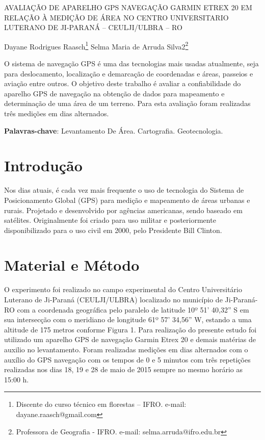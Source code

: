 \documentclass[article,12pt,onesidea,4paper,english,brazil]{abntex2}
\begin{document}
	
	\frenchspacing 
	
	\begin{center}
		\LARGE 
		AVALIAÇÃO DE APARELHO GPS NAVEGAÇÃO GARMIN ETREX 20 EM RELAÇÃO À MEDIÇÃO DE ÁREA NO CENTRO UNIVERSITARIO LUTERANO DE JI-PARANÁ – CEULJI/ULBRA – RO
		
		\normalsize
		Dayane Rodrigues Raasch\footnote{Discente do curso técnico em florestas – IFRO. e-mail: dayane.raasch@gmail.com} 
		Selma Maria de Arruda Silva2\footnote{Professora de Geografia - IFRO. e-mail: selma.arruda@ifro.edu.br} 
	 
	\end{center}
	
	\begin{resumoumacoluna}
O sistema de navegação GPS é uma das tecnologias mais usadas atualmente, seja para deslocamento, localização e demarcação de coordenadas e áreas, passeios e aviação entre outros. O objetivo deste trabalho é avaliar a confiabilidade do aparelho GPS de navegação na obtenção de dados para mapeamento e determinação de uma área de um terreno. Para esta avaliação foram realizadas três medições em dias alternados.
		
		\vspace{\onelineskip}
		
		\noindent
		\textbf{Palavras-chave}: Levantamento De Área. Cartografia. Geotecnologia.
	\end{resumoumacoluna}
	
	\textual
	
	\section*{Introdução}
	
	Nos dias atuais, é cada vez mais frequente o uso de tecnologia do Sistema de Posicionamento Global (GPS) para medição e mapeamento de áreas urbanas e rurais. Projetado e desenvolvido por agências americanas, sendo baseado em satélites. Originalmente foi criado para uso militar e posteriormente disponibilizado para o uso civil em 2000, pelo Presidente Bill Clinton.
	
	\section*{Material e Método}
	
O experimento foi realizado no campo experimental do Centro Universitário Luterano de Ji-Paraná (CEULJI/ULBRA) localizado no município de Ji-Paraná-RO com a coordenada geográfica pelo paralelo de latitude 10º 51’ 40,32” S em sua intersecção com o meridiano de longitude 61º 57’ 34,56” W, estando a uma altitude de 175 metros conforme Figura 1.
Para realização do presente estudo foi utilizado um aparelho GPS de navegação Garmin Etrex 20 e demais matérias de auxilio no levantamento.
Foram realizadas medições em dias alternados com o auxílio do GPS navegação com os tempos de 0 e 5 minutos com três repetições realizadas nos dias 18, 19 e 28 de maio de 2015 sempre no mesmo horário as 15:00 h.
\end{document}
